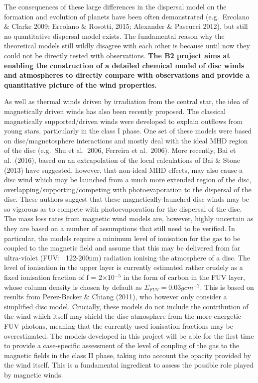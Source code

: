 \documentclass[10pt,fleqn,twoside]{article}
\begin{document}
The consequences of these large differences in the dispersal model on
the formation and evolution of planets have been often demonstrated
(e.g.\ Ercolano \&  Clarke 2009; Ercolano \& Rosotti, 2015; Alexander
\& Pascucci 2012), but still no quantitative dispersal model exists.
The fundamental reason why the theoretical models still wildly
disagree with each other is because until now they could not be
directly tested with observations. {\bf The B2  project aims at enabling
the construction of a detailed chemical model of disc winds and
atmospheres to directly compare with observations and provide a
quantitative picture of the wind properties. }

As well as thermal winds driven by irradiation from the central star,
the idea of magnetically driven winds has also been recently
proposed.  The classical magnetically supported/driven winds were developed to explain outflows from young stars, particularly in the class I phase. One set of these models were based on disc/magnetosphere interactions and mostly deal with the ideal MHD region of the disc (e.g.\ Shu et al.\ 2006, Ferreira et al.\ 2006). 
More recently, Bai et al.\ (2016), based on an extrapolation of the
local calculations of Bai \& Stone (2013) have suggested, however, that
non-ideal MHD effects, may also cause a disc wind which may be
launched from a much more extended region of the disc,
overlapping/supporting/competing with photoevaporation to the
dispersal of the disc. These authors suggest that these magnetically-launched disc
winds may be so vigorous as to compete with
photoevaporation for the dispersal of the disc.
The mass loss rates from magnetic wind models are, however, highly uncertain as they are
based on a number of assumptions that still need to be verified. In
particular, the models require a minimum level of ionisation for the
gas to be coupled to the magnetic field and assume that this may be
delivered from far ultra-violet (FUV: ~122-200nm) radiation ionising
the atmosphere of a disc. The level of ionisation in the upper layer
is currently estimated rather crudely as a fixed ionisation fraction
of f = 2$\times$10$^{-5}$ in the form of carbon in the FUV layer, whose column
density is chosen by default as $\Sigma_{FUV} = 0.03 g cm^{-2}$. This is based on
results from Perez-Becker \& Chiang (2011), who however only consider
a simplified disc model. Crucially, these models do not include the
contribution of the wind which itself may shield the disc atmosphere
from the more energetic FUV photons, meaning that the currently used
ionisation fractions may be overestimated. 
The models developed in this project will be able for the first time
to provide a case-specific assessment of the level of coupling of the
gas to the magnetic fields in the class II phase, taking into account
the opacity provided by the wind itself. This is a fundamental
ingredient to assess the possible role played by magnetic winds.  
\end{document}
